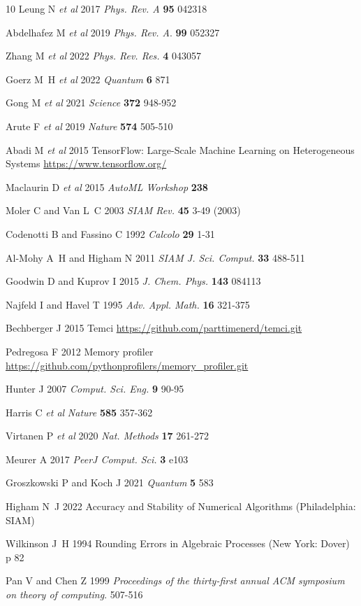 \documentclass[letterpaper,10pt]{iopart}
\begin{document}
\begin{thebibliography}{10}
Leung N {\em et al\/} 
2017
{\em Phys. Rev. A}
{\bf95} 042318 

Abdelhafez M {\em et al\/} 
2019
{\em Phys. Rev. A}.
{\bf99} 052327 

Zhang M {\em et al\/} 
2022
{\em Phys. Rev. Res.}
{\bf4} 043057 

Goerz M~H {\em et al\/}
2022
{\em Quantum}
{\bf6}  871 

Gong M {\em et al\/}
2021
{\em Science}
{\bf372} 948-952 

Arute F {\em et al\/}
2019
{\em Nature}
\textbf{574} 505-510  

Abadi M {\em et al\/}
2015
TensorFlow: Large-Scale Machine Learning on Heterogeneous Systems
\url{https://www.tensorflow.org/}

Maclaurin D {\em et al\/}
2015
{\em AutoML Workshop}
\textbf{238}  

Moler C and Van L~C
2003
{\em SIAM Rev.}
\textbf{45} 3-49 (2003)

Codenotti B and Fassino C 
1992
{\em Calcolo}
\textbf{29} 1-31 

Al-Mohy A~H and Higham N 
2011
{\em SIAM J. Sci. Comput.}
\textbf{33} 488-511  

Goodwin D and Kuprov I
2015
{\em J. Chem. Phys.}
\textbf{143} 084113 

Najfeld I and Havel T 
1995
{\em Adv. Appl. Math. }
\textbf{16} 321-375 

Bechberger J
2015
Temci
\url{https://github.com/parttimenerd/temci.git}

Pedregosa F
2012
Memory profiler
\url{https://github.com/pythonprofilers/memory_profiler.git}

Hunter J
2007
{\em Comput. Sci. Eng.}
\textbf{9} 90-95 

Harris C {\em et al\/}
{\em Nature}
\textbf{585} 357-362 

Virtanen P {\em et al\/}
2020
{\em Nat. Methods}
\textbf{17} 261-272 

Meurer A 
2017
{\em PeerJ Comput. Sci.}
\textbf{3}  e103 

Groszkowski P and Koch J 
2021
{\em Quantum}
\textbf{5} 583 

Higham N~J
2022
Accuracy and Stability of Numerical Algorithms
(Philadelphia: SIAM)

Wilkinson J~H
1994
Rounding Errors in Algebraic Processes (New York: Dover)
p 82

Pan V and Chen Z 
1999
{\em Proceedings of the thirty-first annual ACM symposium on theory of computing}. 
 507-516 

\end{thebibliography}
\end{document}
